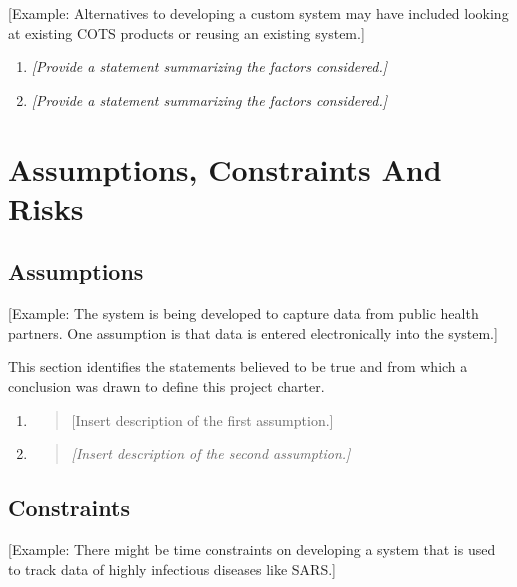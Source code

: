 \documentclass[a4paper, 11pt]{article}
\begin{document}
{[}Example: Alternatives to developing a custom system may have included
looking at existing COTS products or reusing an existing system.{]}

\begin{enumerate}
\def\labelenumi{\arabic{enumi}.}
\item
  \emph{{[}Provide a statement summarizing the factors considered.{]}}
\item
  \emph{{[}Provide a statement summarizing the factors considered.{]}}
\end{enumerate}

\hypertarget{assumptions-constraints-and-risks}{%
\section{Assumptions, Constraints And Risks}\label{assumptions-constraints-and-risks}}

\hypertarget{assumptions}{%
\subsection{Assumptions}\label{assumptions}}

{[}Example: The system is being developed to capture data from public
health partners. One assumption is that data is entered electronically
into the system.{]}

This section identifies the statements believed to be true and from
which a conclusion was drawn to define this project charter.

\begin{enumerate}
\def\labelenumi{\arabic{enumi}.}
\item
  \begin{quote}
  {[}Insert description of the first assumption.{]}
  \end{quote}
\item
  \begin{quote}
  \emph{{[}Insert description of the second assumption.{]}}
  \end{quote}
\end{enumerate}

\hypertarget{constraints}{%
\subsection{Constraints}\label{constraints}}

{[}Example: There might be time constraints on developing a system that
is used to track data of highly infectious diseases like SARS.{]}
\end{document}
